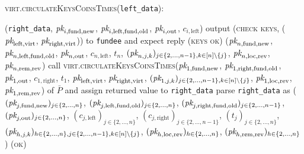 \begin{center}
\begin{processbox}{\textsc{virt}.\textsc{circulateKeysCoinsTimes}(\texttt{left\_data}):}
\begin{algorithmic}[1]
          \State \Return (\texttt{right\_data}, $\textit{pk}_{i, \mathrm{fund},
          \mathrm{new}}$, $\textit{pk}_{i, \mathrm{left}, \mathrm{fund}, \mathrm{old}}$,
          $\textit{pk}_{i, \mathrm{out}}$, $c_{i, \mathrm{left}}$)
        \Else \: 
          \State output (\textsc{check keys}, ($\textit{pk}_{\mathrm{left},
          \mathrm{virt}}$, $\textit{pk}_{\mathrm{right}, \mathrm{virt}}$)) to
          \texttt{fundee} and expect reply (\textsc{keys ok})
          \State \Return ($\textit{pk}_{n, \mathrm{fund}, \mathrm{new}}$, $\textit{pk}_{n,
          \mathrm{left}, \mathrm{fund}, \mathrm{old}}$, $\textit{pk}_{n, \mathrm{out}}$,
          $c_{n, \mathrm{left}}$, $t_n$, $(\textit{pk}_{n, j, k})_{j \in \{2, \dots,
          n-1\}, k \in [n] \setminus \{j\}}$, $\textit{pk}_{n, \mathrm{loc},
          \mathrm{rev}}$, $\textit{pk}_{n, \mathrm{rem}, \mathrm{rev}}$)
        \EndIf
      \Else \: 
        \State call \textsc{virt.circulateKeysCoinsTimes}($\textit{pk}_{1, \mathrm{fund},
        \mathrm{new}}$, $\textit{pk}_{1, \mathrm{right}, \mathrm{fund}, \mathrm{old}}$,
        $\textit{pk}_{1, \mathrm{out}}$, $c_{1, \mathrm{right}}$, $t_1$,
        $\textit{pk}_{\mathrm{left}, \mathrm{virt}}$, $\textit{pk}_{\mathrm{right},
        \mathrm{virt}}$, $(\textit{pk}_{1, j, k})_{j \in \{2, \dots, n-1\}, k \in [n]
        \setminus \{j\}}$, $\textit{pk}_{1, \mathrm{loc}, \mathrm{rev}}$, $\textit{pk}_{1,
        \mathrm{rem}, \mathrm{rev}}$) of $\bar{P}$ and assign returned value to
        \texttt{right\_data}
        \State parse \texttt{right\_data} as ($(\textit{pk}_{j, \mathrm{fund},
        \mathrm{new}})_{j \in \{2, \dots, n\}}$, $(\textit{pk}_{j, \mathrm{left},
        \mathrm{fund}, \mathrm{old}})_{j \in \{2, \dots, n\}}$, $(\textit{pk}_{j,
        \mathrm{right}, \mathrm{fund}, \mathrm{old}})_{j \in \{2, \dots,
        n-1\}}$, $(\textit{pk}_{j, \mathrm{out}})_{j \in \{2, \dots, n\}}$, $(c_{j,
        \mathrm{left}})_{j \in \{2, \dots, n\}}$, $(c_{j, \mathrm{right}})_{j
        \in \{2, \dots, n-1\}}$, $(t_j)_{j \in \{2, \dots, n\}}$, $(\textit{pk}_{h, j,
        k})_{h \in \{2, \dots, n\}, j \in \{2, \dots, n-1\}, k \in [n] \setminus
        \{j\}}$, $(\textit{pk}_{h, \mathrm{loc}, \mathrm{rev}})_{h \in \{2, \dots, n\}}$,
        $(\textit{pk}_{h, \mathrm{rem}, \mathrm{rev}})_{h \in \{2, \dots, n\}}$)
        \State \Return (\textsc{ok})
      \EndIf
    \end{algorithmic}
  \end{processbox}
  \label{code:virtual-layer:circulate-keys-and-coins}
\end{center} \ \\

